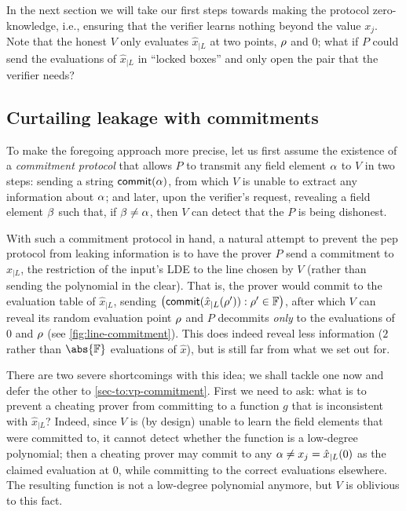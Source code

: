 \documentclass[10pt,a4paper]{article}
\theoremstyle{definition}
\newcommand{\field}{\mathbb{F}}
\newcommand{\pepprotocol}{\textsf{pep}\xspace}
\renewcommand{\line}{L}
\def\fe#1{
    \ifnum#1=1
        \alpha
    \else
    \ifnum#1=2
        \beta
    \else
    \ifnum#1=3
        \gamma
    \fi\fi\fi
}
\def\rfe#1{
    \ifnum#1=1
        \rho
    \else
    \ifnum#1=2
        \sigma
    \else
    \fi\fi
}
\begin{document}
     In the next section we will take our first steps towards making the protocol zero-knowledge, i.e., ensuring that the verifier learns nothing beyond the value $x_j$.
     Note that the honest $V$ only evaluates $\hat x_{|\line}$ at two points, $\rfe1$ and $0$; what if $P$ could send the evaluations of $\hat x_{|\line}$ in ``locked boxes'' and only open the pair that the verifier needs?

\subsection{Curtailing leakage with commitments}
\label{sec-to:pv-commitment}

    To make the foregoing approach more precise, let us first assume the existence of a \emph{commitment protocol} that allows $P$ to transmit any field element $\fe1$ to $V$ in two steps: sending a string $\textsf{commit}(\fe1)$, from which $V$ is unable to extract any information about $\fe1$; and later, upon the verifier's request, revealing a field element $\fe2$ such that, if $\fe2 \neq \fe1$, then $V$ can detect that the $P$ is being dishonest.
    
    With such a commitment protocol in hand, a natural attempt to prevent the \pepprotocol protocol from leaking information is to have the prover $P$ send a commitment to $\hat x_{|\line}$, the restriction of the input's LDE to the line chosen by $V$ (rather than sending the polynomial in the clear). That is, the prover would commit to the evaluation table of $\hat x_{|\line}$, sending $\big(\textsf{commit}(\hat x_{|\line}(\rfe1')) : \rfe1' \in \field\big)$, after which $V$ can reveal its random evaluation point $\rfe1$ and $P$ decommits \emph{only} to the evaluations of $0$ and $\rfe1$  (see \cref{fig:line-commitment}). This does indeed reveal less information ($2$ rather than $\abs{\field}$ evaluations of $\hat x$), but is still far from what we set out for.
    
    There are two severe shortcomings with this idea; we shall tackle one now and defer the other to \cref{sec-to:vp-commitment}. First we need to ask: what is to prevent a cheating prover from committing to a function $g$ that is inconsistent with $\hat x_{|\line}$? 
    Indeed, since $V$ is (by design) unable to learn the field elements that were committed to, it cannot detect whether the function is a low-degree polynomial; then a cheating prover may commit to any $\fe1 \neq x_j = \hat x_{|\line}(0)$ as the claimed evaluation at $0$, while committing to the correct evaluations elsewhere. The resulting function is not a low-degree polynomial anymore, but $V$ is oblivious to this fact.
\end{document}

